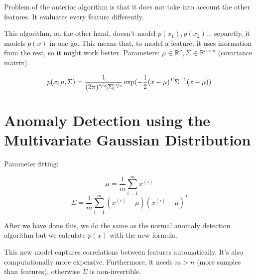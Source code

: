\documentclass[10pt]{extarticle}
\begin{document}
Problem of the anterior algorithm is that it does not take into account
the other features. It evaluates every feature differently.

This algorithm, on the other hand, doesn't model $p(x_1), p(x_2) \dots $
separetly, it models $p(x)$ in one go. This means that, to model a
feature, it uses inormation from the rest, so it might work better.
Parameters: $\mu \in \mathbb{R}^n, \Sigma \in \mathbb{R}^{n \times n}$
(covariance matrix).

\[ p(x;\mu,\Sigma) = \frac{1}{(2\pi)^{\nicefrac{n}{2}} | \Sigma | ^{\nicefrac{1}{2}}} \exp(-\frac{1}{2} (x-\mu)^T \Sigma^{-1} (x-\mu)) \]

\section{Anomaly Detection using the Multivariate Gaussian
Distribution}\label{anomaly-detection-using-the-multivariate-gaussian-distribution}

Parameter fitting:

\[ \mu = \frac{1}{m} \sum_{i=1}^m x^{(i)} \]
\[ \Sigma = \frac{1}{m} \sum_{i=1}^m (x^{(i)} - \mu)(x^{(i)} - \mu)^T\]

After we have done this, we do the same as the normal anomaly detection
algorithm but we calculate $p(x)$ with the new formula. \bigskip

This new model captures correlations between features automatically.
It's also computationally more expensive. Furthermore, it needs $m > n$
(more samples than features), otherwise $\Sigma$ is non-invertible.




\clearpage



    \nocite{*}



\end{document}
